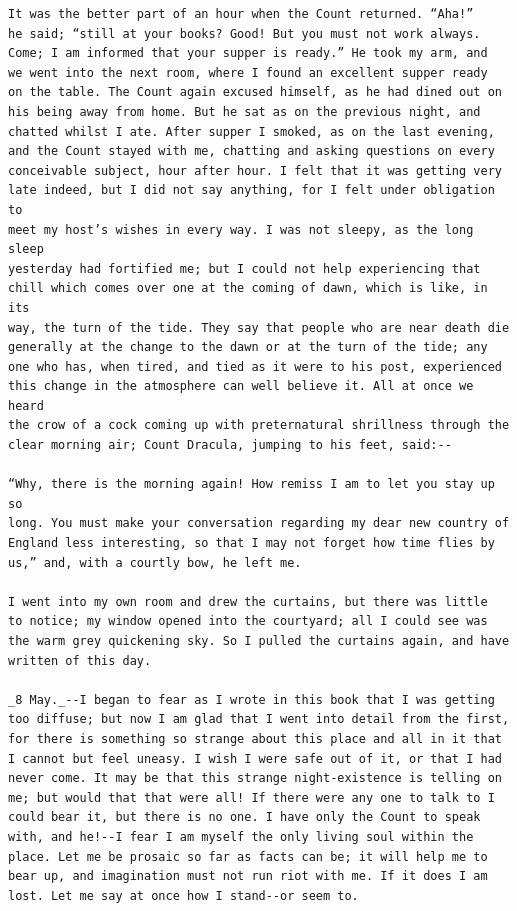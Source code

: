 \documentclass{article}
\begin{document}
\begin{verbatim}
It was the better part of an hour when the Count returned. “Aha!”
he said; “still at your books? Good! But you must not work always.
Come; I am informed that your supper is ready.” He took my arm, and
we went into the next room, where I found an excellent supper ready
on the table. The Count again excused himself, as he had dined out on
his being away from home. But he sat as on the previous night, and
chatted whilst I ate. After supper I smoked, as on the last evening,
and the Count stayed with me, chatting and asking questions on every
conceivable subject, hour after hour. I felt that it was getting very
late indeed, but I did not say anything, for I felt under obligation to
meet my host’s wishes in every way. I was not sleepy, as the long sleep
yesterday had fortified me; but I could not help experiencing that
chill which comes over one at the coming of dawn, which is like, in its
way, the turn of the tide. They say that people who are near death die
generally at the change to the dawn or at the turn of the tide; any
one who has, when tired, and tied as it were to his post, experienced
this change in the atmosphere can well believe it. All at once we heard
the crow of a cock coming up with preternatural shrillness through the
clear morning air; Count Dracula, jumping to his feet, said:--

“Why, there is the morning again! How remiss I am to let you stay up so
long. You must make your conversation regarding my dear new country of
England less interesting, so that I may not forget how time flies by
us,” and, with a courtly bow, he left me.

I went into my own room and drew the curtains, but there was little
to notice; my window opened into the courtyard; all I could see was
the warm grey quickening sky. So I pulled the curtains again, and have
written of this day.

_8 May._--I began to fear as I wrote in this book that I was getting
too diffuse; but now I am glad that I went into detail from the first,
for there is something so strange about this place and all in it that
I cannot but feel uneasy. I wish I were safe out of it, or that I had
never come. It may be that this strange night-existence is telling on
me; but would that that were all! If there were any one to talk to I
could bear it, but there is no one. I have only the Count to speak
with, and he!--I fear I am myself the only living soul within the
place. Let me be prosaic so far as facts can be; it will help me to
bear up, and imagination must not run riot with me. If it does I am
lost. Let me say at once how I stand--or seem to.


\end{verbatim}
\end{document}
